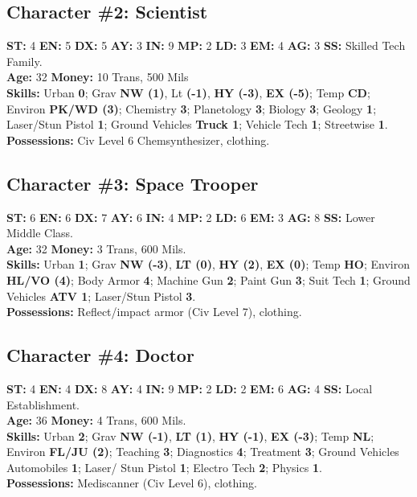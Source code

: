 \subsection{Character \#2: Scientist}
\label{sec:char-2:-scient}

\textbf{ST:} 4 \textbf{EN:} 5 \textbf{DX:} 5 \textbf{AY:} 3 \textbf{IN:} 9 \textbf{MP:} 2 \textbf{LD:} 3 \textbf{EM:} 4 \textbf{AG:} 3 \textbf{SS:} Skilled Tech Family. \\
\textbf{Age:} 32 \textbf{Money:} 10 Trans, 500 Mils \\
\textbf{Skills:} Urban \textbf{0}; Grav \textbf{NW (1)}, Lt\textbf{ (-1)}, \textbf{HY (-3)}, \textbf{EX (-5)}; Temp \textbf{CD}; Environ \textbf{PK/WD (3)}; Chemistry \textbf{3}; Planetology \textbf{3}; Biology \textbf{3}; 
Geology \textbf{1}; Laser/Stun Pistol \textbf{1}; Ground Vehicles
\textbf{Truck 1}; Vehicle Tech \textbf{1}; Streetwise \textbf{1}. \\
\textbf{Possessions:} Civ Level 6 Chemsynthesizer, clothing. 


\subsection{Character \#3: Space Trooper}
\label{sec:character-3:-space}

\textbf{ST:} 6 \textbf{EN:} 6 \textbf{DX:} 7 \textbf{AY:} 6 \textbf{IN:} 4 \textbf{MP:} 2 \textbf{LD:} 6 \textbf{EM:} 3 \textbf{AG:} 8 \textbf{SS:} Lower Middle Class. \\
\textbf{Age:} 32 \textbf{Money:} 3 Trans, 600 Mils. \\
\textbf{Skills:} Urban \textbf{1}; Grav \textbf{NW (-3)}, \textbf{LT
  (0)}, \textbf{HY (2)}, \textbf{EX (0)}; Temp \textbf{HO}; Environ \textbf{HL/VO (4)}; Body Armor \textbf{4}; Machine Gun \textbf{2}; Paint Gun \textbf{3}; 
Suit Tech \textbf{1}; Ground Vehicles \textbf{ATV 1}; Laser/Stun Pistol \textbf{3}. \\
\textbf{Possessions:} Reflect/impact armor (Civ 
Level 7), clothing. 


\subsection{Character \#4: Doctor}
\label{sec:character-4:-doctor}

\textbf{ST:} 4 \textbf{EN:} 4 \textbf{DX:} 8 \textbf{AY:} 4 \textbf{IN:} 9 \textbf{MP:} 2 \textbf{LD:} 2 \textbf{EM:} 6 \textbf{AG:} 4 \textbf{SS:} Local Establishment. \\
\textbf{Age:} 36 \textbf{Money:} 4 Trans, 600 Mils. \\
\textbf{Skills:} Urban \textbf{2}; Grav \textbf{NW (-1)}, \textbf{LT (1)}, \textbf{HY (-1)}, \textbf{EX (-3)}; Temp \textbf{NL}; Environ \textbf{FL/JU (2)}; Teaching \textbf{3}; Diagnostics \textbf{4}; Treatment \textbf{3}; 
Ground Vehicles Automobiles \textbf{1}; Laser/ Stun Pistol \textbf{1}; Electro Tech \textbf{2}; Physics \textbf{1}. \\
\textbf{Possessions:} Mediscanner (Civ Level 6), clothing. 


